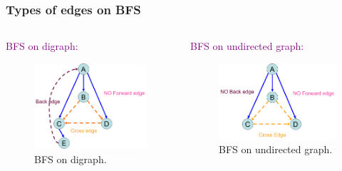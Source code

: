 \begin{frame}
  \frametitle{Types of edges on BFS}

  \begin{columns}
    \begin{column}{0.50\textwidth}
      \textcolor{purple}{BFS on digraph:}
      \begin{figure}
        \includegraphics[scale=0.30]{figure/bfs_dfs/bfsdi}
        \caption{{\scriptsize BFS on digraph.}}
        \label{fig:bfsdi}
      \end{figure}
    \end{column}
  
    \begin{column}{0.50\textwidth}
      \textcolor{purple}{BFS on undirected graph:}
      \begin{figure}
        \includegraphics[scale=0.30]{figure/bfs_dfs/bfsundirected}
        \caption{{\scriptsize BFS on undirected graph.}}
        \label{fig:bfsundirected}
      \end{figure}
    \end{column}
  \end{columns}
  
\end{frame}



